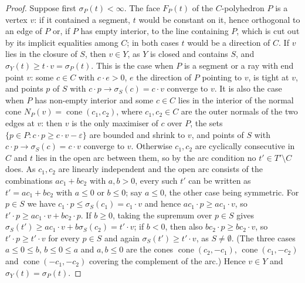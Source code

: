 \documentclass[11pt]{amsart}
\theoremstyle{definition}
\begin{document}
\begin{proof}
Suppose first $\sigma_P(t)<\infty$. The face $F_P(t)$ of the
$C$-polyhedron $P$ is a vertex $v$: if it contained a segment, $t$
would be constant on it, hence orthogonal to an edge of $P$ or, if $P$
has empty interior, to the line containing $P$, which is cut out by its
implicit equalities among $C$; in both cases $t$ would be a direction of
$C$. If $v$ lies in the closure of $S$, then $v\in Y$, as $Y$ is closed
and contains $S$, and $\sigma_Y(t)\ge t\cdot v=\sigma_P(t)$. This is the
case when $P$ is a segment or a ray with end point $v$: some $c\in C$
with $c\cdot e>0$, $e$ the direction of $P$ pointing to $v$, is tight at
$v$, and points $p$ of $S$ with $c\cdot p\to\sigma_S(c)=c\cdot v$
converge to $v$. It is also the case when $P$ has non-empty interior
and some $c\in C$ lies in the interior of the normal cone $N_P(v)=
\operatorname{cone}(c_1,c_2)$, where $c_1,c_2\in C$ are the outer
normals of the two edges at $v$: then $v$ is the only maximiser of $c$
over $P$, the sets $\{p\in P:c\cdot p\ge c\cdot v-\varepsilon\}$ are
bounded and shrink to $v$, and points of $S$ with $c\cdot p\to\sigma_S
(c)=c\cdot v$ converge to $v$. Otherwise $c_1,c_2$ are cyclically
consecutive in $C$ and $t$ lies in the open arc between them, so by the
arc condition no $t'\in T'\setminus C$ does. As $c_1,c_2$ are linearly
independent and the open arc consists of the combinations $ac_1+bc_2$
with $a,b>0$, every such $t'$ can be written as $t'=ac_1+bc_2$ with
$a\le0$ or $b\le0$; say $a\le0$, the other case being symmetric. For
$p\in S$ we have $c_1\cdot p\le\sigma_S(c_1)=c_1\cdot v$ and hence
$ac_1\cdot p\ge ac_1\cdot v$, so $t'\cdot p\ge ac_1\cdot v+bc_2\cdot p$.
If $b\ge0$, taking the supremum over $p\in S$ gives $\sigma_S(t')\ge
ac_1\cdot v+b\sigma_S(c_2)=t'\cdot v$; if $b<0$, then also $bc_2\cdot
p\ge bc_2\cdot v$, so $t'\cdot p\ge t'\cdot v$ for every $p\in S$ and
again $\sigma_S(t')\ge t'\cdot v$, as $S\ne\emptyset$. (The three cases
$a\le0\le b$, $b\le0\le a$ and $a,b\le0$ are the cones
$\operatorname{cone}(c_2,-c_1)$, $\operatorname{cone}(c_1,-c_2)$ and
$\operatorname{cone}(-c_1,-c_2)$ covering the complement of the arc.)
Hence $v\in Y$ and $\sigma_Y(t)=\sigma_P(t)$.


\end{proof}
\end{document}

